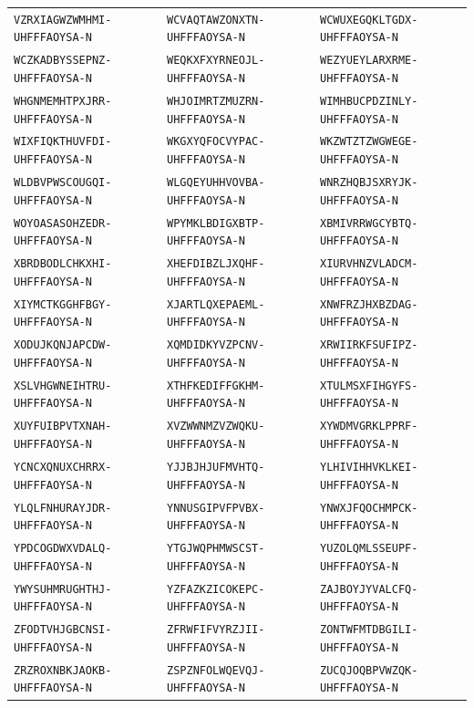 {\begin{longtable}{@{}lll@{}}
\texttt{VZRXIAGWZWMHMI-UHFFFAOYSA-N} & \texttt{WCVAQTAWZONXTN-UHFFFAOYSA-N} & \texttt{WCWUXEGQKLTGDX-UHFFFAOYSA-N} \\
\texttt{WCZKADBYSSEPNZ-UHFFFAOYSA-N} & \texttt{WEQKXFXYRNEOJL-UHFFFAOYSA-N} & \texttt{WEZYUEYLARXRME-UHFFFAOYSA-N} \\
\texttt{WHGNMEMHTPXJRR-UHFFFAOYSA-N} & \texttt{WHJOIMRTZMUZRN-UHFFFAOYSA-N} & \texttt{WIMHBUCPDZINLY-UHFFFAOYSA-N} \\
\texttt{WIXFIQKTHUVFDI-UHFFFAOYSA-N} & \texttt{WKGXYQFOCVYPAC-UHFFFAOYSA-N} & \texttt{WKZWTZTZWGWEGE-UHFFFAOYSA-N} \\
\texttt{WLDBVPWSCOUGQI-UHFFFAOYSA-N} & \texttt{WLGQEYUHHVOVBA-UHFFFAOYSA-N} & \texttt{WNRZHQBJSXRYJK-UHFFFAOYSA-N} \\
\texttt{WOYOASASOHZEDR-UHFFFAOYSA-N} & \texttt{WPYMKLBDIGXBTP-UHFFFAOYSA-N} & \texttt{XBMIVRRWGCYBTQ-UHFFFAOYSA-N} \\
\texttt{XBRDBODLCHKXHI-UHFFFAOYSA-N} & \texttt{XHEFDIBZLJXQHF-UHFFFAOYSA-N} & \texttt{XIURVHNZVLADCM-UHFFFAOYSA-N} \\
\texttt{XIYMCTKGGHFBGY-UHFFFAOYSA-N} & \texttt{XJARTLQXEPAEML-UHFFFAOYSA-N} & \texttt{XNWFRZJHXBZDAG-UHFFFAOYSA-N} \\
\texttt{XODUJKQNJAPCDW-UHFFFAOYSA-N} & \texttt{XQMDIDKYVZPCNV-UHFFFAOYSA-N} & \texttt{XRWIIRKFSUFIPZ-UHFFFAOYSA-N} \\
\texttt{XSLVHGWNEIHTRU-UHFFFAOYSA-N} & \texttt{XTHFKEDIFFGKHM-UHFFFAOYSA-N} & \texttt{XTULMSXFIHGYFS-UHFFFAOYSA-N} \\
\texttt{XUYFUIBPVTXNAH-UHFFFAOYSA-N} & \texttt{XVZWWNMZVZWQKU-UHFFFAOYSA-N} & \texttt{XYWDMVGRKLPPRF-UHFFFAOYSA-N} \\
\texttt{YCNCXQNUXCHRRX-UHFFFAOYSA-N} & \texttt{YJJBJHJUFMVHTQ-UHFFFAOYSA-N} & \texttt{YLHIVIHHVKLKEI-UHFFFAOYSA-N} \\
\texttt{YLQLFNHURAYJDR-UHFFFAOYSA-N} & \texttt{YNNUSGIPVFPVBX-UHFFFAOYSA-N} & \texttt{YNWXJFQOCHMPCK-UHFFFAOYSA-N} \\
\texttt{YPDCOGDWXVDALQ-UHFFFAOYSA-N} & \texttt{YTGJWQPHMWSCST-UHFFFAOYSA-N} & \texttt{YUZOLQMLSSEUPF-UHFFFAOYSA-N} \\
\texttt{YWYSUHMRUGHTHJ-UHFFFAOYSA-N} & \texttt{YZFAZKZICOKEPC-UHFFFAOYSA-N} & \texttt{ZAJBOYJYVALCFQ-UHFFFAOYSA-N} \\
\texttt{ZFODTVHJGBCNSI-UHFFFAOYSA-N} & \texttt{ZFRWFIFVYRZJII-UHFFFAOYSA-N} & \texttt{ZONTWFMTDBGILI-UHFFFAOYSA-N} \\
\texttt{ZRZROXNBKJAOKB-UHFFFAOYSA-N} & \texttt{ZSPZNFOLWQEVQJ-UHFFFAOYSA-N} & \texttt{ZUCQJOQBPVWZQK-UHFFFAOYSA-N} \\
\end{longtable}
}
